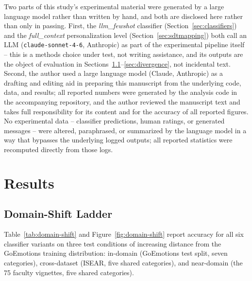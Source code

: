 \documentclass[higheredu,article,submit,pdftex,moreauthors]{Definitions/mdpi}
\begin{document}
Two parts of this study's experimental material were generated by a large language model rather than written by hand, and both are disclosed here rather than only in passing. First, the \textit{llm\_fewshot} classifier (Section~\ref{sec:classifiers}) and the \textit{full\_context} personalization level (Section~\ref{sec:sdtmapping}) both call an LLM (\texttt{claude-sonnet-4-6}, Anthropic) as part of the experimental pipeline itself -- this is a methods choice under test, not writing assistance, and its outputs are the object of evaluation in Sections~\ref{sec:domainshift}--\ref{sec:divergence}, not incidental text. Second, the author used a large language model (Claude, Anthropic) as a drafting and editing aid in preparing this manuscript from the underlying code, data, and results; all reported numbers were generated by the analysis code in the accompanying repository, and the author reviewed the manuscript text and takes full responsibility for its content and for the accuracy of all reported figures. No experimental data -- classifier predictions, human ratings, or generated messages -- were altered, paraphrased, or summarized by the language model in a way that bypasses the underlying logged outputs; all reported statistics were recomputed directly from those logs.

\section{Results}

\subsection{Domain-Shift Ladder}
\label{sec:domainshift}

Table~\ref{tab:domain-shift} and Figure~\ref{fig:domain-shift} report accuracy for all six classifier variants on three test conditions of increasing distance from the GoEmotions training distribution: in-domain (GoEmotions test split, seven categories), cross-dataset (ISEAR, five shared categories), and near-domain (the 75 faculty vignettes, five shared categories).
\end{document}
